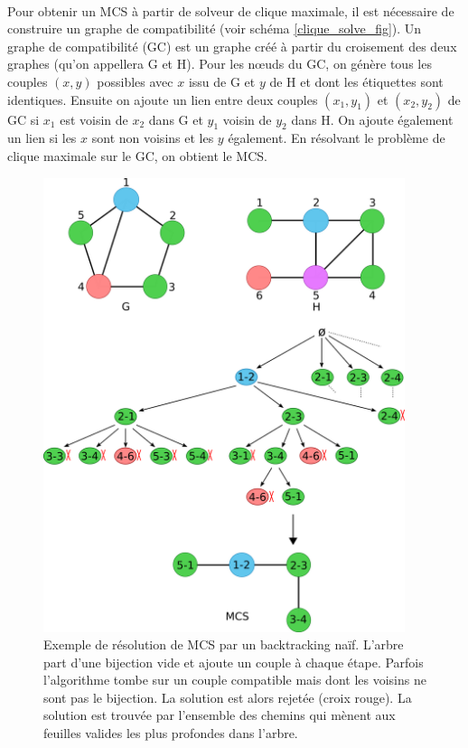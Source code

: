 \documentclass[12pt,french,twoside]{report}
\begin{document}
\paragraph{}Pour obtenir un MCS à partir de solveur de clique maximale, il est nécessaire de construire un graphe de compatibilité (voir schéma \ref{clique_solve_fig}).
Un graphe de compatibilité (GC) est un graphe créé à partir du croisement des deux graphes (qu'on appellera G et H).
Pour les n\oe{}uds du GC, on génère tous les couples $(x, y)$ possibles avec $x$ issu de G et $y$ de H et dont les étiquettes sont identiques.
Ensuite on ajoute un lien entre deux couples $(x_1 , y_1)$ et $(x_2 , y_2)$ de GC si $x_1$ est voisin de $x_2$ dans G et $y_1$ voisin de $y_2$ dans H.
On ajoute également un lien si les $x$ sont non voisins et les $y$ également.
En résolvant le problème de clique maximale sur le GC, on obtient le MCS.


\begin{figure}[!ht]
  \begin{center}
    \includegraphics[width=400px]{Figures/s2m/MCS-SI/backtracking_solve.png}
    \caption{\label{backtracking_solve}Exemple de résolution de MCS par un backtracking naïf.
    L'arbre part d'une bijection vide et ajoute un couple à chaque étape.
    Parfois l'algorithme tombe sur un couple compatible mais dont les voisins ne sont pas le bijection.
    La solution est alors rejetée (croix rouge).
    La solution est trouvée par l'ensemble des chemins qui mènent aux feuilles valides les plus profondes dans l'arbre.}
  \end{center}
\end{figure}
\end{document}
